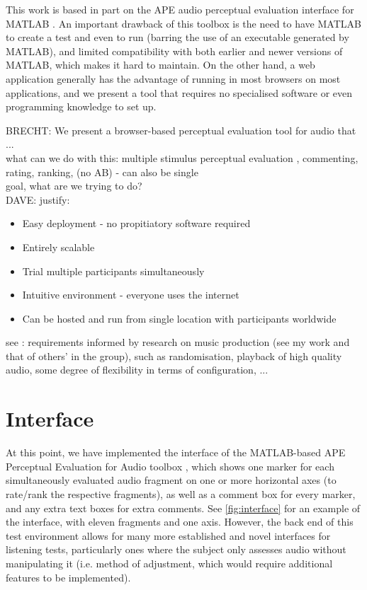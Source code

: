 \documentclass{article}
\begin{document}
This work is based in part on the APE audio perceptual evaluation interface for MATLAB \cite{deman2014b}. An important drawback of this toolbox is the need to have MATLAB to create a test and even to run (barring the use of an executable generated by MATLAB), and limited compatibility with both earlier and newer versions of MATLAB, which makes it hard to maintain. On the other hand, a web application generally has the advantage of running in most browsers on most applications, and we present a tool that requires no specialised software or even programming knowledge to set up. 

BRECHT: We present a browser-based perceptual evaluation tool for audio that ... \\
what can we do with this: multiple stimulus perceptual evaluation \cite{bech}, commenting, rating, ranking, (no AB) - can also be single \\ %
goal, what are we trying to do? \\

DAVE: justify:
\begin{itemize}
\item Easy deployment - no propitiatory software required
\item Entirely scalable
\item Trial multiple participants simultaneously
\item Intuitive environment - everyone uses the internet
\item Can be hosted and run from single location with participants worldwide
\end{itemize}




see \cite{deman2014b}: requirements informed by research on music production (see my work and that of others' in the group), such as randomisation, playback of high quality audio, some degree of flexibility in terms of configuration, ... \\


\section{Interface}\label{sec:interface}

At this point, we have implemented the interface of the MATLAB-based APE Perceptual Evaluation for Audio toolbox \cite{deman2014b}, which shows one marker for each simultaneously evaluated audio fragment on one or more horizontal axes (to rate/rank the respective fragments), as well as a comment box for every marker, and any extra text boxes for extra comments. See \ref{fig:interface} for an example of the interface, with eleven fragments and one axis. However, the back end of this test environment allows for many more established and novel interfaces for listening tests, particularly ones where the subject only assesses audio without manipulating it (i.e. method of adjustment, which would require additional features to be implemented). 
\end{document}
